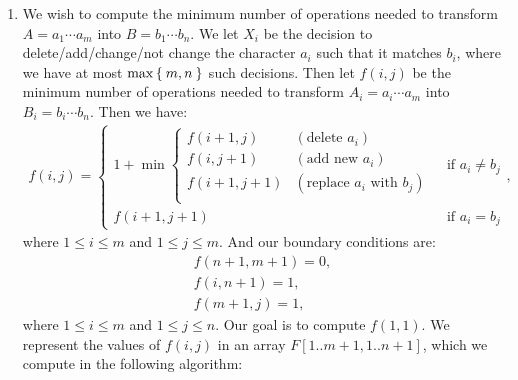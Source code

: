 \documentclass[10pt,oneside,reqno]{amsart}
\makeatletter
\theoremstyle{plain}
\theoremstyle{definition}
\theoremstyle{remark}
\newcommand{\bb}{\vspace{3mm}}
\newcommand{\bee}{\begin{equation}\begin{aligned}}
\newcommand{\eee}{\end{aligned}\end{equation}}
\newenvironment{restoretext}%
    {\@parboxrestore%
     \begin{adjustwidth}{}{\leftmargin}%
    }{\end{adjustwidth}
     }
\makeatother
\begin{document}
\begin{enumerate}[label=\arabic*.]
\bb






\item We wish to compute the minimum number of operations needed to transform $A = a_1\cdots a_m$ into $B = b_1\cdots b_n$. We let $X_i$ be the decision to delete/add/change/not change the character $a_i$ such that it matches $b_i$, where we have at most $\max\Set{m,n}$ such decisions. Then let $f(i,j)$ be the minimum number of operations needed to transform $A_i = a_i\cdots a_m$ into $B_i = b_i \cdots b_n$. Then we have:
\bee
f(i,j) =  \begin{cases}
1 + \min\begin{cases}
f(i + 1,j) & (\text{delete } a_i)\\
f(i, j + 1) & (\text{add new }a_i)\\
f(i + 1,j + 1) & (\text{replace } a_i \text{ with } b_j)\\
\end{cases} & \text{ if } a_i \neq b_j\\
f(i + 1,j + 1) & \text{ if } a_i = b_j
\end{cases},
\eee
where $1 \leq i \leq m$ and $1 \leq j \leq m$. And our boundary conditions are:
\bee
f(n + 1,m + 1) = 0,\\
f(i,n + 1) = 1,\\
f(m + 1,j) = 1,
\eee
where $1 \leq i \leq m$ and $1 \leq j \leq n$. 
Our goal is to compute $f(1,1)$. We represent the values of $f(i,j)$ in an array $F[1..m + 1,1..n + 1]$, which we compute in the following algorithm:


\begin{restoretext}
\begin{algorithm}[H]\label{alg2}
\end{algorithm}
\end{restoretext}
\end{enumerate}
\end{document}
